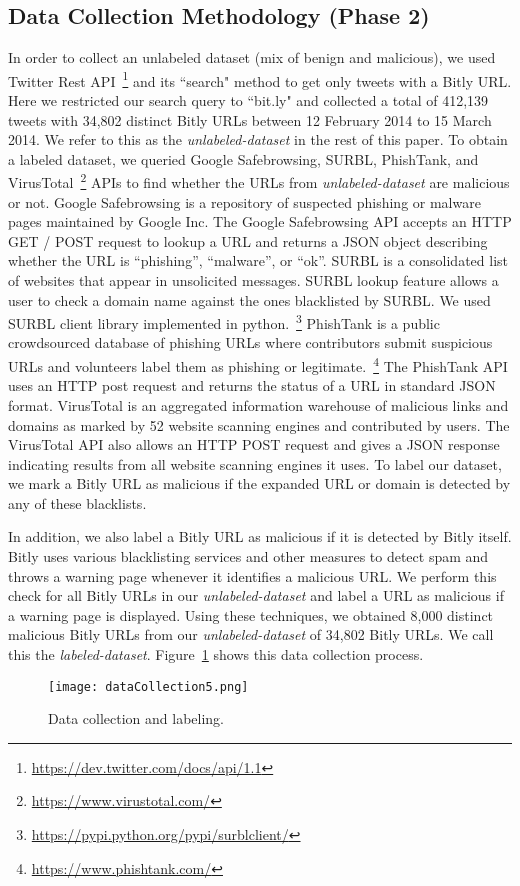 \documentclass[conference]{IEEEtran}
\begin{document}
\subsection{Data Collection Methodology (Phase 2)}
\vspace{4pt}
In order to collect an unlabeled dataset (mix of benign and malicious), we used Twitter Rest API~\footnote{\url{https://dev.twitter.com/docs/api/1.1}} and its ``search" method to get only tweets with a Bitly URL. Here we restricted our search query to ``bit.ly" and collected a total of 412,139 tweets with 34,802 distinct Bitly URLs between 12 February 2014 to 15 March 2014. We refer to this as the \textit{unlabeled-dataset} in the rest of this paper.
To obtain a labeled dataset, we queried Google Safebrowsing, SURBL, PhishTank, and VirusTotal~\footnote{\url{https://www.virustotal.com/}} APIs to find whether the URLs from \textit{unlabeled-dataset} are malicious or not. Google Safebrowsing is a repository of suspected phishing or malware pages maintained by Google Inc. The Google Safebrowsing API accepts an HTTP GET / POST request to lookup a URL and returns a JSON object describing whether the URL is ``phishing'', ``malware'', or ``ok''.  SURBL is a consolidated list of websites that appear in unsolicited messages. SURBL lookup feature allows a user to check a domain name against the ones blacklisted by SURBL. We used SURBL client library implemented in python.~\footnote{\url{https://pypi.python.org/pypi/surblclient/}} PhishTank is a public crowdsourced database of phishing URLs where contributors submit suspicious URLs and volunteers label them as phishing or legitimate.~\footnote{\url{https://www.phishtank.com/}} The PhishTank API uses an HTTP post request and returns the status of a URL in standard JSON format. VirusTotal is an aggregated information warehouse of malicious links and domains as marked by 52 website scanning engines and contributed by users. The VirusTotal API also allows an HTTP POST request and gives a JSON response indicating results from all website scanning engines it uses. To label our dataset, we mark a Bitly URL as malicious if the expanded URL or domain is detected by any of these blacklists.  

In addition, we also label a Bitly URL as malicious if it is detected by Bitly itself. Bitly uses various blacklisting services and other measures to detect spam and throws a warning page whenever it identifies a malicious URL. We perform this check for all Bitly URLs in our \textit{unlabeled-dataset} and label a URL as malicious if a warning page is displayed. Using these techniques, we obtained 8,000 distinct malicious Bitly URLs from our \textit{unlabeled-dataset} of 34,802 Bitly URLs. We call this the \textit{labeled-dataset}. Figure~\ref{dataCollectionLabeling} shows this data collection process.
\begin{figure}[h!]
 	\centering
		\texttt{[image: dataCollection5.png]}
	\caption{Data collection and labeling.}
		\label{dataCollectionLabeling}
\end{figure}
\end{document}
